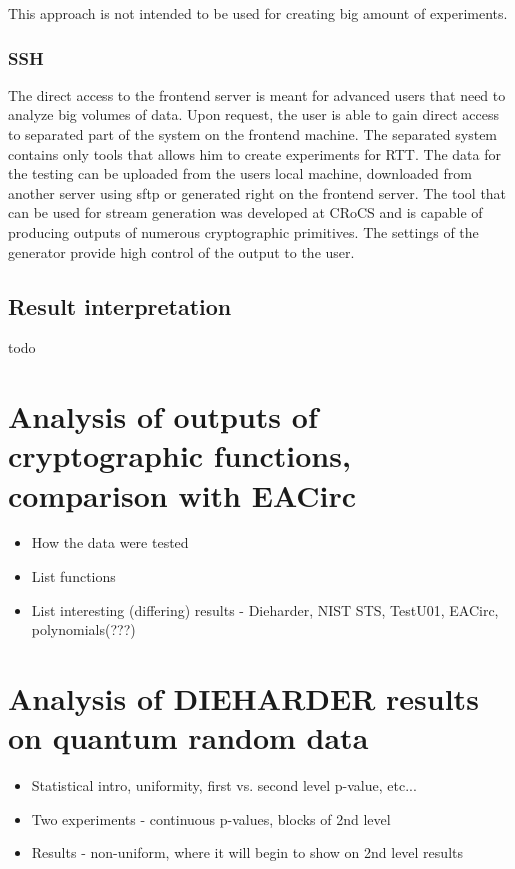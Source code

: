\documentclass[
  digital,  	%
  color,		%
  oneside,   	%
  12pt,
  nocover,
  notable,
  nolof,
  nolot,
]{fithesis3}
\begin{document}
This approach is not intended to be used for creating big amount of experiments.

\subsection{SSH}
The direct access to the frontend server is meant for advanced users that need to analyze big volumes of data. Upon request, the user is able to gain direct access to separated part of the system on the frontend machine. The separated system contains only tools that allows him to create experiments for RTT. The data for the testing can be uploaded from the users local machine, downloaded from another server using sftp or generated right on the frontend server. The tool that can be used for stream generation was developed at CRoCS and is capable of producing outputs of numerous cryptographic primitives. The settings of the generator provide high control of the output to the user. 

\section{Result interpretation}
\begin{huge}
todo
\end{huge}

\chapter{Analysis of outputs of cryptographic functions, comparison with EACirc}
\begin{itemize}
\item How the data were tested
\item List functions
\item List interesting (differing) results - Dieharder, NIST STS, TestU01, EACirc, polynomials(???)
\end{itemize}

\chapter{Analysis of DIEHARDER results on quantum random data}
\begin{itemize}
\item Statistical intro, uniformity, first vs. second level p-value, etc...
\item Two experiments - continuous p-values, blocks of 2nd level
\item Results - non-uniform, where it will begin to show on 2nd level results
\end{itemize}
\end{document}
